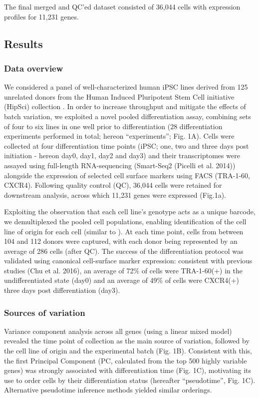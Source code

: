 The final merged and QC’ed dataset consisted of 36,044 cells with expression profiles for 11,231 genes.


\subsection{Results}

\subsubsection{Data overview}

 We considered a panel of well-characterized human iPSC lines derived from 125 unrelated donors from the Human Induced Pluripotent Stem Cell initiative (HipSci) collection \cite{kilpinen2017common}. 
 In order to increase throughput and mitigate the effects of batch variation, we exploited a novel pooled differentiation assay, combining sets of four to six lines in one well prior to differentiation (28 differentiation experiments performed in total; hereon “experiments”; Fig. 1A). 
 Cells were collected at four differentiation time points (iPSC; one, two and three days post initiation - hereon day0, day1, day2 and day3) and their transcriptomes were assayed using full-length RNA-sequencing (Smart-Seq2 (Picelli et al. 2014)) alongside the expression of selected cell surface markers using FACS (TRA-1-60, CXCR4). 
 Following quality control (QC), 36,044 cells were retained for downstream analysis, across which 11,231 genes were expressed (Fig.1a).
 
 Exploiting the observation that each cell line’s genotype acts as a unique barcode, we demultiplexed the pooled cell populations, enabling identification of the cell line of origin for each cell (similar to \cite{kang2018multiplexed}). 
 At each time point, cells from between 104 and 112 donors were captured, with each donor being represented by an average of 286 cells (after QC). 
 The success of the differentiation protocol was validated using canonical cell-surface marker expression: consistent with previous studies (Chu et al. 2016), an average of 72\% of cells were TRA-1-60(+) in the undifferentiated state (day0) and an average of 49\% of cells were CXCR4(+) three days post differentiation (day3).

\subsubsection{Sources of variation} 

Variance component analysis across all genes (using a linear mixed model) revealed the time point of collection as the main source of variation, followed by the cell line of origin and the experimental batch (Fig. 1B). 
Consistent with this, the first Principal Component (PC, calculated from the top 500 highly variable genes) was strongly associated with differentiation time (Fig. 1C), motivating its use to order cells by their differentiation status (hereafter “pseudotime”, Fig. 1C).
Alternative pseudotime inference methods yielded similar orderings.

